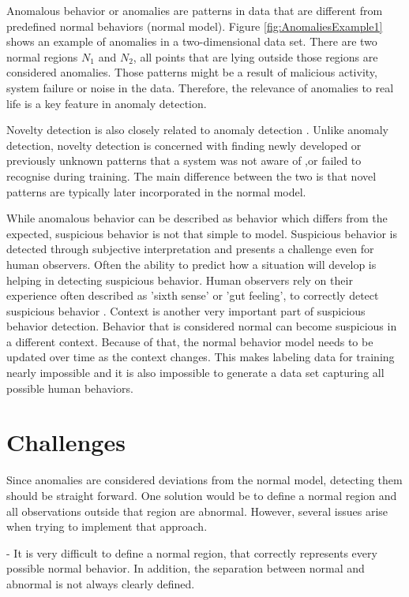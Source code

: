 Anomalous behavior or anomalies are patterns in data that are different from predefined normal behaviors (normal model). Figure \ref{fig:AnomaliesExample1} shows an example of anomalies in a two-dimensional data set. There are two normal regions \(N_{1}\) and \(N_{2}\), all points that are lying outside those regions are considered anomalies. Those patterns might be a result of malicious activity, system failure or noise in the data. Therefore, the relevance of anomalies to real life is a key feature in anomaly detection\cite{n24}.

Novelty detection is also closely related to anomaly detection \cite{n16,n17}. Unlike anomaly detection, novelty detection is concerned with finding newly developed or previously unknown patterns that a system was not aware of ,or failed to recognise during training. The main difference between the two is that novel patterns are typically later incorporated in the normal model.

While anomalous behavior can be described as behavior which differs from the expected, suspicious behavior is not that simple to model. Suspicious behavior is detected through subjective interpretation and presents a challenge even for human observers. Often the ability to predict how a situation will develop is helping in detecting suspicious behavior. Human observers rely on their experience often described as 'sixth sense' or 'gut feeling', to correctly detect suspicious behavior \cite{n18}. Context is another very important part of suspicious behavior detection. Behavior that is considered normal can become suspicious in a different context. Because of that, the normal behavior model needs to be updated over time as the context changes. This makes labeling data for training nearly impossible and it is also impossible to generate a data set capturing all possible human behaviors\cite{n24}.


\section{Challenges}

Since anomalies are considered deviations from the normal model, detecting them should be straight forward. One solution would be to define a normal region and all observations outside that region are abnormal. However, several issues arise when trying to implement that approach.

- It is very difficult to define a normal region, that correctly represents every possible normal behavior. In addition, the separation between normal and abnormal is not always clearly defined.

